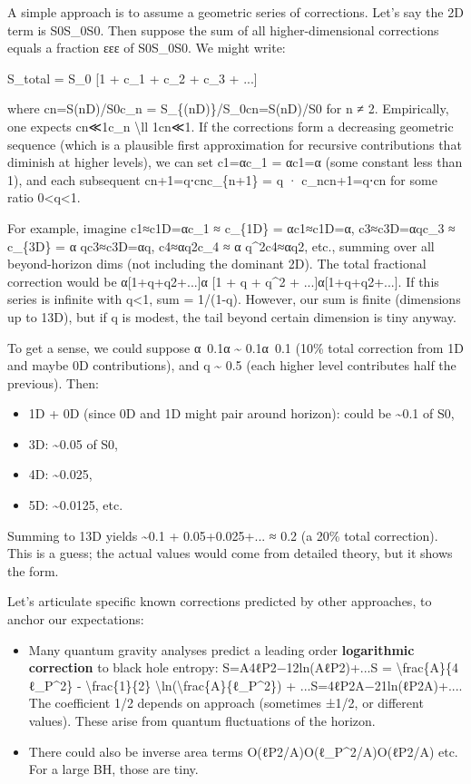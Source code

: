 \documentclass[]{article}
\begin{document}
A simple approach is to assume a geometric series of corrections. Let's
say the 2D term is S0S\_0S0​. Then suppose the sum of all
higher-dimensional corrections equals a fraction εεε of S0S\_0S0​. We
might write:

S\_total = S\_0 {[}1 + c\_1 + c\_2 + c\_3 + ...{]}

where cn=S(nD)/S0c\_n = S\_\{(nD)\}/S\_0cn​=S(nD)​/S0​ for n ≠ 2.
Empirically, one expects cn≪1c\_n \textbackslash{}ll 1cn​≪1. If the
corrections form a decreasing geometric sequence (which is a plausible
first approximation for recursive contributions that diminish at higher
levels), we can set c1=αc\_1 = αc1​=α (some constant less than 1), and
each subsequent cn+1=q⋅cnc\_\{n+1\} = q · c\_ncn+1​=q⋅cn​ for some ratio
0\textless{}q\textless{}1.

For example, imagine c1≈c1D=αc\_1 ≈ c\_\{1D\} = αc1​≈c1D​=α,
c3≈c3D=αqc\_3 ≈ c\_\{3D\} = α qc3​≈c3D​=αq, c4≈αq2c\_4 ≈ α
q\^{}2c4​≈αq2, etc., summing over all beyond-horizon dims (not including
the dominant 2D). The total fractional correction would be
α{[}1+q+q2+...{]}α {[}1 + q + q\^{}2 + ...{]}α{[}1+q+q2+...{]}. If this
series is infinite with \textbar{}q\textbar{}\textless{}1, sum =
1/(1-q). However, our sum is finite (dimensions up to 13D), but if q is
modest, the tail beyond certain dimension is tiny anyway.

To get a sense, we could suppose α~0.1α \textasciitilde{} 0.1α~0.1 (10\%
total correction from 1D and maybe 0D contributions), and q
\textasciitilde{} 0.5 (each higher level contributes half the previous).
Then:

\begin{itemize}
\item
  1D + 0D (since 0D and 1D might pair around horizon): could be
  \textasciitilde{}0.1 of S0,
\item
  3D: \textasciitilde{}0.05 of S0,
\item
  4D: \textasciitilde{}0.025,
\item
  5D: \textasciitilde{}0.0125, etc.
\end{itemize}

Summing to 13D yields \textasciitilde{}0.1 + 0.05+0.025+... ≈ 0.2 (a
20\% total correction). This is a guess; the actual values would come
from detailed theory, but it shows the form.

Let's articulate specific known corrections predicted by other
approaches, to anchor our expectations:

\begin{itemize}
\item
  Many quantum gravity analyses predict a leading order
  \textbf{logarithmic correction} to black hole entropy:
  S=A4ℓP2−12ln⁡(AℓP2)+...S = \textbackslash{}frac\{A\}\{4 ℓ\_P\^{}2\} -
  \textbackslash{}frac\{1\}\{2\}
  \textbackslash{}ln(\textbackslash{}frac\{A\}\{ℓ\_P\^{}2\}) +
  ...S=4ℓP2​A​−21​ln(ℓP2​A​)+.... The coefficient 1/2 depends on
  approach (sometimes ±1/2, or different values). These arise from
  quantum fluctuations of the horizon.
\item
  There could also be inverse area terms O(ℓP2/A)O(ℓ\_P\^{}2/A)O(ℓP2​/A)
  etc. For a large BH, those are tiny.
\end{itemize}
\end{document}
